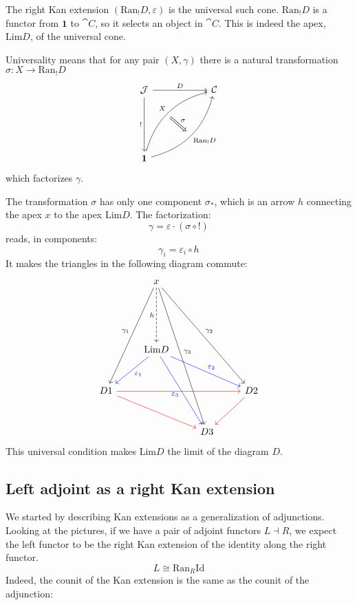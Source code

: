 \documentclass[DaoFP]{subfiles}
\begin{document}
The right Kan extension $(\text{Ran}_! D, \varepsilon)$ is the universal such cone. $\text{Ran}_! D$ is a functor from $\mathbf 1$ to $\cat C$, so it selects an object in $\cat C$. This is indeed the apex, $\text{Lim} D$, of the universal cone. 

Universality means that for any pair $(X, \gamma)$ there is a natural transformation $\sigma \colon X \to \text{Ran}_! D$ 
\[
\begin{tikzcd}[row sep=2cm, column sep=2cm]
\cat J  \ar[d, "!"', "" {name=P}]
            \ar[r, "D", ""  {name=F, below, near start, bend right}]
&
\cat C
\\
\mathbf 1
    \ar[ur, bend left, "X", "" {name=G, below}]
    \ar[ur, bend right, "\text{Ran}_! D"', "" {name=Ran}]
\arrow[Rightarrow, "\sigma", from=G, to=Ran]
\end{tikzcd}
\]
which factorizes $\gamma$. 

The transformation $\sigma$ has only one component $\sigma_*$, which is an arrow $h$ connecting the apex $x$ to the apex $\text{Lim} D$. The factorization:
 \[ \gamma = \varepsilon \cdot (\sigma \circ !) \]
reads, in components:
\[ \gamma_i = \varepsilon_i \circ h \]
It makes the triangles in the following diagram commute:
\[
 \begin{tikzcd}[row sep=1cm]
  & x
\arrow[dddl, "\gamma_1"']
\arrow[ddddr, "\gamma_3"]
\arrow[dddrr, "\gamma_2"]
\arrow[dd, dashed, "h"']
 \\
 \\
 & \text{Lim} D
\arrow[dl, blue, "\varepsilon_1"]
\arrow[ddr, blue, "\varepsilon_3"']
\arrow[drr, blue, "\varepsilon_2"]
\\
D 1 
\arrow[rrr, red]
\arrow[rrd, red]
&&& D 2
\arrow[dl, red]
\\
&& D 3
 \end{tikzcd}
 \]
This universal condition makes $\text{Lim} D$ the limit of the diagram $D$.


 \subsection{Left adjoint as a right Kan extension}
 
 We started by describing Kan extensions as a generalization of adjunctions. Looking at the pictures, if we have a pair of adjoint functors $L \dashv R$, we expect the left functor to be the right Kan extension of the identity along the right functor.
 \[ L \cong \text{Ran}_R \text{Id} \]
Indeed, the counit of the Kan extension is the same as the counit of the adjunction:
\end{document}
